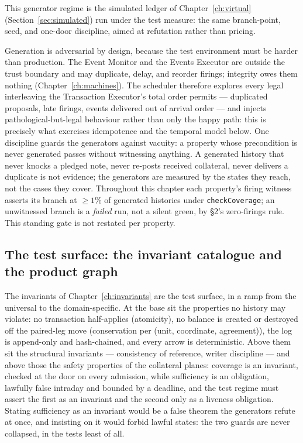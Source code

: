 This generator regime is the simulated ledger of Chapter~\ref{ch:virtual}
(Section~\ref{sec:simulated}) run under the test measure: the same branch-point,
seed, and one-door discipline, aimed at refutation rather than pricing.

Generation is adversarial by design, because the test environment must be harder than
production. The Event Monitor and the Events Executor are outside the trust boundary and may
duplicate, delay, and reorder firings; integrity owes them nothing
(Chapter~\ref{ch:machines}). The scheduler therefore explores every legal interleaving the
Transaction Executor's total order permits --- duplicated proposals, late firings, events
delivered out of arrival order --- and injects pathological-but-legal behaviour rather than
only the happy path: this is precisely what exercises idempotence and the temporal model
below. One discipline guards the generators against vacuity: a property whose precondition
is never generated passes without witnessing anything. A generated history that never knocks
a pledged note, never re-posts received collateral, never delivers a duplicate is not
evidence; the generators are measured by the states they reach, not the cases they cover.
Throughout this chapter each property's firing witness asserts its branch at $\ge 1\%$ of
generated histories under \texttt{checkCoverage}; an unwitnessed branch is a \emph{failed}
run, not a silent green, by \S 2's zero-firings rule. This standing gate is not restated per
property.

\subsection{The test surface: the invariant catalogue and the product graph}

The invariants of Chapter~\ref{ch:invariants} are the test surface, in a ramp from the
universal to the domain-specific. At the base sit the properties no history may violate: no
transaction half-applies (atomicity), no balance is created or destroyed off the paired-leg
move (conservation per (unit, coordinate, agreement)), the log is append-only and
hash-chained, and every arrow is deterministic. Above them sit the structural invariants --- consistency of
reference, writer discipline --- and above those the safety properties of the collateral
planes: coverage is an invariant, checked at the door on every admission, while sufficiency
is an obligation, lawfully false intraday and bounded by a deadline, and the test regime
must assert the first as an invariant and the second only as a liveness obligation. Stating
sufficiency as an invariant would be a false theorem the generators refute at once, and
insisting on it would forbid lawful states: the two guards are never collapsed, in the tests
least of all.

